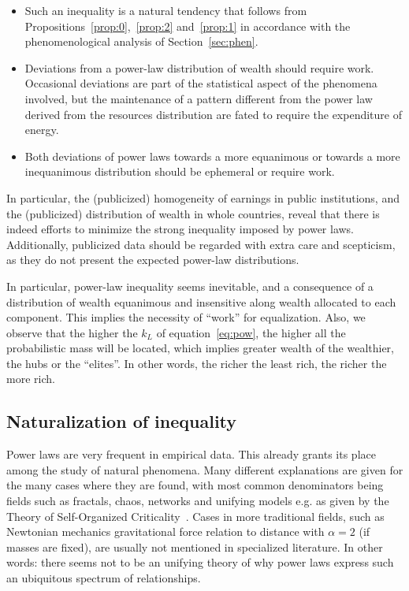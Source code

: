 \documentclass[a4paper, 11pt]{article} %
\begin{document}
\begin{itemize}
	\item Such an inequality is a natural tendency that follows from Propositions~\ref{prop:0},~\ref{prop:2} and~\ref{prop:1} in accordance with the phenomenological analysis of Section~\ref{sec:phen}.
	\item Deviations from a power-law distribution of wealth should require work.
		Occasional deviations are part of the statistical aspect of the phenomena involved, but the maintenance of a pattern different from the power law derived from the resources distribution are fated to require the expenditure of energy.
	\item Both deviations of power laws towards a more equanimous or towards a more inequanimous distribution should be ephemeral or require work.
\end{itemize}

In particular, the (publicized)
homogeneity of earnings in public institutions,
and the (publicized) distribution of wealth in whole countries,
reveal that there is indeed efforts to minimize
the strong inequality imposed by power laws.
Additionally, publicized data should be regarded with
extra care and scepticism, as they do not present the
expected power-law distributions.

In particular, power-law inequality seems inevitable,
and a consequence of a distribution of wealth equanimous and insensitive
along wealth allocated to each component.
This implies the necessity of ``work'' for equalization.
Also, we observe that the higher the $k_L$ of equation~\ref{eq:pow}, the
higher all the probabilistic mass will be located, which
implies greater wealth of the wealthier, the hubs or the ``elites''.
In other words, the richer the least rich,
the richer the more rich.

\subsection{Naturalization of inequality}

Power laws are very frequent in empirical data.
This already grants its place among the study of natural phenomena.
Many different explanations are given for the many cases where
they are found, with most common denominators being fields such as
fractals, chaos, networks and unifying models e.g. as given by the Theory of Self-Organized Criticality~\cite{part}. Cases in more traditional fields, such as Newtonian mechanics gravitational force relation to distance with $\alpha=2$ (if masses are fixed), are usually not mentioned in specialized literature. In other words: there seems not to be an unifying theory of why power laws express such
an ubiquitous spectrum of relationships.
\end{document}
